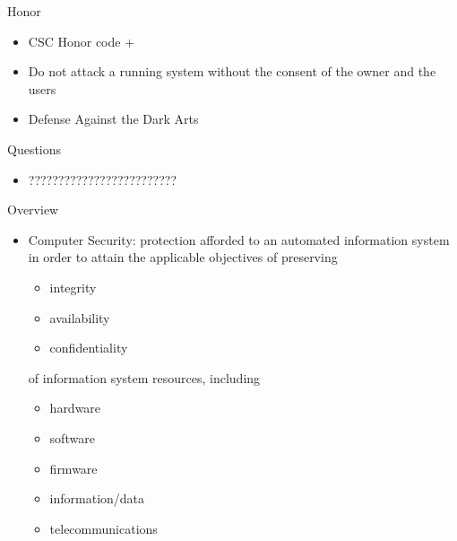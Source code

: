 \documentclass{beamer}
\begin{document}
\begin{frame}{Honor}
  \begin{itemize}
  \item CSC Honor code +
  \item \alert{Do not attack a running system 
    without the consent of the owner 
    and the users}
  \item Defense Against the Dark Arts
  \end{itemize}
\end{frame}

\begin{frame}{Questions}
  \begin{itemize}
  \item ?????????????????????????
  \end{itemize}
\end{frame}

\begin{frame}{Overview}
  \begin{itemize}
  \item \alert{Computer Security}: protection afforded to an 
    automated information system in order to attain 
    the applicable objectives of preserving
    
    \begin{itemize}
    \item integrity
    \item availability
    \item confidentiality
    \end{itemize}
of  information system resources, including
 
\begin{itemize}
  \item hardware
  \item software
  \item firmware
  \item information/data
  \item telecommunications
\end{itemize}
  \end{itemize}
\end{frame}
\end{document}
